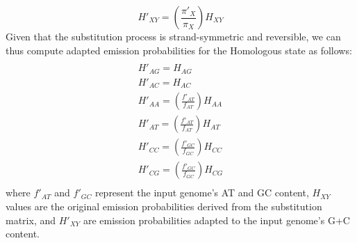 \begin{equation}
H'_{XY}=(\frac{\pi'_X}{\pi_X})  H_{XY}
\end{equation}
\thispagestyle{empty}
Given that the substitution process is
strand-symmetric and reversible, we can thus compute adapted
emission probabilities for the Homologous state as follows:
\begin{multline}\\
H'_{AG}=H_{AG}\\
H'_{AC}=H_{AC}\\
H'_{AA}=(\frac{f'_{AT}}{f_{AT}})H_{AA}\\
H'_{AT}=(\frac{f'_{AT}}{f_{AT}})H_{AT}\\
H'_{CC}=(\frac{f'_{GC}}{f_{GC}})H_{CC}\\
H'_{CG}=(\frac{f'_{GC}}{f_{GC}})H_{CG}\\
\end{multline}
where $f'_{AT}$ and $f'_{GC}$ represent the input genome's AT and GC content,
$H_{XY}$ values are the original emission probabilities derived from the
substitution matrix, and $H'_{XY}$ are emission probabilities adapted to
the input genome's G+C content.


